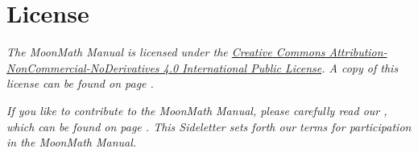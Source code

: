 \newpage
\thispagestyle{empty}
\mbox{}
\newpage

\chapter*{License}
\itshape{}
The MoonMath Manual is licensed under the \href{https://creativecommons.org/licenses/by-nc-nd/4.0/}{Creative Commons Attribution-NonCommercial-NoDerivatives 4.0 International Public License}. A copy of this license can be found on page \pageref{chapter:license}.

\textit{If you like to contribute to the MoonMath Manual, please carefully read our , which can be found on page \pageref{sideletter}. This Sideletter sets forth our terms for participation in the MoonMath Manual.}

\upshape{}